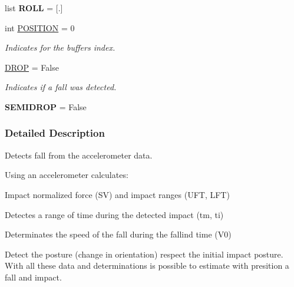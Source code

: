 \begin{DoxyCompactItemize}
\item 
\hypertarget{classfall_detection_1_1_fall_detection_aa44f488c9296cf9c27f037ae246d1649}{list {\bfseries R\-O\-L\-L} = \mbox{[}.\mbox{]}}\label{classfall_detection_1_1_fall_detection_aa44f488c9296cf9c27f037ae246d1649}

\item 
\hypertarget{classfall_detection_1_1_fall_detection_a529e246a5c2c87bdb5c6426abeeb8dfb}{int \hyperlink{classfall_detection_1_1_fall_detection_a529e246a5c2c87bdb5c6426abeeb8dfb}{P\-O\-S\-I\-T\-I\-O\-N} = 0}\label{classfall_detection_1_1_fall_detection_a529e246a5c2c87bdb5c6426abeeb8dfb}

\begin{DoxyCompactList}\small\item\em Indicates for the buffers index. \end{DoxyCompactList}\item 
\hyperlink{classfall_detection_1_1_fall_detection_afa9560adcae4144df3ba9a753c920060}{D\-R\-O\-P} = False
\begin{DoxyCompactList}\small\item\em Indicates if a fall was detected. \end{DoxyCompactList}\item 
\hypertarget{classfall_detection_1_1_fall_detection_a2d6eb7f362620d5992fc5d6ab4d5880b}{{\bfseries S\-E\-M\-I\-D\-R\-O\-P} = False}\label{classfall_detection_1_1_fall_detection_a2d6eb7f362620d5992fc5d6ab4d5880b}

\end{DoxyCompactItemize}


\subsubsection{Detailed Description}
Detects fall from the accelerometer data. 

Using an accelerometer calculates\-:
\begin{DoxyItemize}
\item Impact normalized force (S\-V) and impact ranges (U\-F\-T, L\-F\-T)
\item Detectes a range of time during the detected impact (tm, ti)
\item Determinates the speed of the fall during the fallind time (V0)
\item Detect the posture (change in orientation) respect the initial impact posture. With all these data and determinations is possible to estimate with presition a fall and impact.
\end{DoxyItemize}


